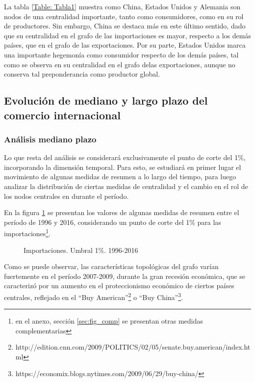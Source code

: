 \documentclass[class=article, crop=false]{standalone}
\begin{document}
La tabla \ref{Table: Tabla1} muestra como China, Estados Unidos y Alemania son nodos de una centralidad importante, tanto como consumidores, como en su rol de productores. Sin embargo, China se destaca más en este último sentido, dado que su centralidad en el grafo de las importaciones es mayor, respecto a los demás países, que en el grafo de las exportaciones. Por su parte, Estados  Unidos marca una importante hegemonía como consumidor respecto de los demás países, tal como se observa en su centralidad en el grafo delas exportaciones, aunque no conserva tal preponderancia como productor global. 

\subsection{Evolución de mediano y largo plazo del comercio internacional}

\subsubsection{Análisis mediano plazo}

Lo que resta del análisis se considerará exclusivamente el punto de corte del 1\%, incorporando la dimensión temporal. Para esto, se estudiará en primer lugar el movimiento de algunas medidas de resumen a lo largo del tiempo, para luego analizar la distribución de ciertas medidas de centralidad y el cambio en el rol de los nodos centrales en durante el período.


En la figura \ref{fig:caracteristicas_yr} se presentan los valores de algunas medidas de resumen entre el período de 1996 y 2016, considerando un punto de corte del 1\% para las importaciones\footnote{en el anexo, sección \ref{sec:fig_comp} se presentan otras medidas complementarias}. 



\begin{figure}
\centering
{}
\caption{Importaciones. Umbral 1\%. 1996-2016}
\label{fig:caracteristicas_yr}
\end{figure}


Como se puede observar, las características topológicas del grafo varían fuertemente en el período 2007-2009, durante la gran recesión económica, que se caracterizó por un aumento en el proteccionismo económico de ciertos países centrales, reflejado en el “Buy American”\footnote{http://edition.cnn.com/2009/POLITICS/02/05/senate.buy.american/index.html} o “Buy China”\footnote{https://economix.blogs.nytimes.com/2009/06/29/buy-china/}. 
\end{document}
